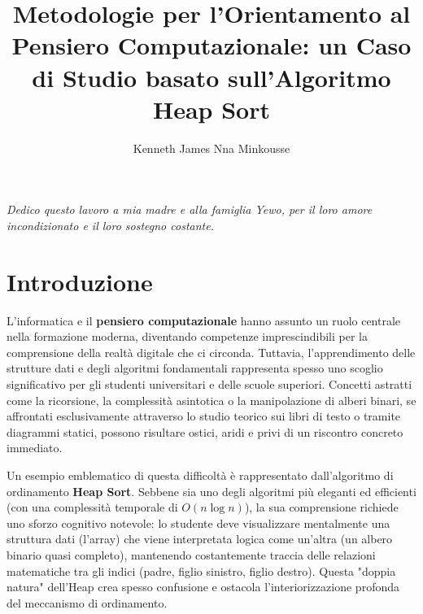\documentclass[openany]{theme/uniprthesis}
\title{Metodologie per l'Orientamento al Pensiero Computazionale: un Caso di Studio basato sull'Algoritmo Heap Sort}
\author{Kenneth James Nna Minkousse}
\begin{document}
\maketitle

\clearpage
\thispagestyle{empty}
\vspace*{\fill}
\begin{flushright}
\textit{Dedico questo lavoro a mia madre e alla famiglia Yewo, per il loro amore incondizionato e il loro sostegno costante.}
\end{flushright}
\vspace*{\fill}
\clearpage

\pagestyle{plain}
\tableofcontents
\newpage
{}
\listoffigures
\newpage



\chapter*{Introduzione}

L'informatica e il \textbf{pensiero computazionale} hanno assunto un ruolo centrale nella formazione moderna, diventando competenze imprescindibili per la comprensione della realtà digitale che ci circonda. Tuttavia, l'apprendimento delle strutture dati e degli algoritmi fondamentali rappresenta spesso uno scoglio significativo per gli studenti universitari e delle scuole superiori. Concetti astratti come la ricorsione, la complessità asintotica o la manipolazione di alberi binari, se affrontati esclusivamente attraverso lo studio teorico sui libri di testo o tramite diagrammi statici, possono risultare ostici, aridi e privi di un riscontro concreto immediato.

Un esempio emblematico di questa difficoltà è rappresentato dall'algoritmo di ordinamento \textbf{Heap Sort}. Sebbene sia uno degli algoritmi più eleganti ed efficienti (con una complessità temporale di $O(n \log n)$), la sua comprensione richiede uno sforzo cognitivo notevole: lo studente deve visualizzare mentalmente una struttura dati (l'array) che viene interpretata logica come un'altra (un albero binario quasi completo), mantenendo costantemente traccia delle relazioni matematiche tra gli indici (padre, figlio sinistro, figlio destro). Questa "doppia natura" dell'Heap crea spesso confusione e ostacola l'interiorizzazione profonda del meccanismo di ordinamento.
\end{document}
